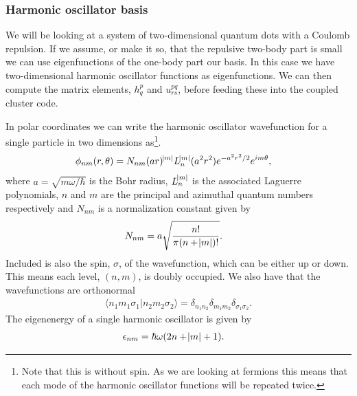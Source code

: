 \documentclass[
    a4paper, aps, twocolumn, floatfix, superscriptaddress,
    nofootinbib]{revtex4-1}
\newcommand{\1}{\mathds{1}}
\newcommand{\braket}[2]{\langle #1 \vert #2 \rangle}
\begin{document}
        \subsubsection{Harmonic oscillator basis}
            We will be looking at a system of two-dimensional quantum dots with
            a Coulomb repulsion.  If we assume, or make it so, that the
            repulsive two-body part is small we can use eigenfunctions of the
            one-body part our basis. In this case we have two-dimensional
            harmonic oscillator functions as eigenfunctions. We can then compute
            the matrix elements, $h_q^p$ and $u_{rs}^{pq}$, before feeding these
            into the coupled cluster code.

            In polar coordinates we can write the harmonic oscillator
            wavefunction for a single particle in two dimensions
            as\footnote{Note that this is without spin. As we are looking at
            fermions this means that each mode of the harmonic oscillator
            functions will be repeated twice.}.
            \begin{align}
                \phi_{nm}(r, \theta)
                &=
                N_{nm}
                (ar)^{\abs{m}}L_n^{\abs{m}}(a^2 r^2)e^{-a^2 r^2/2}
                e^{im\theta},
            \end{align}
            where $a = \sqrt{m\omega/\hbar}$ is the Bohr radius, $L_n^{\abs{m}}$
            is the associated Laguerre polynomials, $n$ and $m$ are the
            principal and azimuthal quantum numbers respectively and $N_{nm}$ is
            a normalization constant given by
            \begin{align}
                N_{nm}
                &= a\sqrt{\frac{n!}{\pi(n + \abs{m})!}}.
            \end{align}
            Included is also the spin, $\sigma$, of the wavefunction, which can
            be either up or down. This means each level, $(n, m)$, is doubly
            occupied. We also have that the wavefunctions are orthonormal
            \begin{align}
                \braket{n_1m_1\sigma_1}{n_2m_2\sigma_2}
                = \delta_{n_1n_2}\delta_{m_1m_2}\delta_{\sigma_1\sigma_2}.
            \end{align}
            The eigenenergy of a single harmonic oscillator is given by
            \begin{align}
                \epsilon_{nm} &= \hbar\omega(2n + \abs{m} + 1).
            \end{align}
\end{document}

